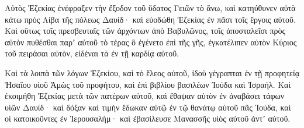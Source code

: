 {\par }{\PP {}Αὐτὸς Ἐζεκίας ἐνέφραξεν τὴν ἔξοδον τοῦ ὕδατος Γειῶν τὸ ἄνω, καὶ κατηύθυνεν αὐτὰ κάτω πρὸς Λίβα τῆς πόλεως Δαυίδ· καὶ εὐοδώθη Ἐζεκίας ἐν πᾶσι τοῖς ἔργοις αὐτοῦ.
Καὶ οὕτως τοῖς πρεσβευταῖς τῶν ἀρχόντων ἀπὸ Βαβυλῶνος, τοῖς ἀποσταλεῖσι πρὸς αὐτὸν πυθέσθαι παρʼ αὐτοῦ τὸ τέρας ὃ ἐγένετο ἐπὶ τῆς γῆς, ἐγκατέλιπεν αὐτὸν Κύριος τοῦ πειράσαι αὐτὸν, εἰδέναι τὰ ἐν τῇ καρδίᾳ αὐτοῦ.
\par }{\PP {}Καὶ τὰ λοιπὰ τῶν λόγων Ἐζεκίου, καὶ τὸ ἔλεος αὐτοῦ, ἰδοὺ γέγραπται ἐν τῇ προφητείᾳ Ἡσαΐου υἱοῦ Ἀμὼς τοῦ προφήτου, καὶ ἐπὶ βιβλίου βασιλέων Ἰούδα καὶ Ἰσραήλ.
Καὶ ἐκοιμήθη Ἐζεκίας μετὰ τῶν πατέρων αὐτοῦ, καὶ ἔθαψαν αὐτὸν ἐν ἀναβάσει τάφων υἱῶν Δαυίδ· καὶ δόξαν καὶ τιμὴν ἔδωκαν αὐτῷ ἐν τῷ θανάτῳ αὐτοῦ πᾶς Ἰούδα, καὶ οἱ κατοικοῦντες ἐν Ἱερουσαλήμ· καὶ ἐβασίλευσε Μανασσῆς υἱὸς αὐτοῦ ἀντʼ αὐτοῦ.

}
